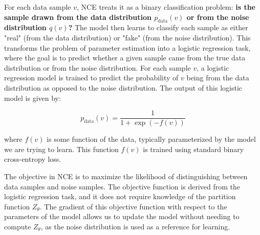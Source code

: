 \documentclass{article}
\begin{document}
\begin{enumerate}
For each data sample \( v \), NCE treats it as a binary classification problem: 
\textbf{is the sample drawn from the data distribution \( p_{\text{data}}(v) \) or from the noise distribution \( q(v) \)?}
The model then learns to classify each sample as either "real" (from the data distribution) or "fake" (from the noise distribution). This transforms the problem of parameter estimation into a logistic regression task, where the goal is to predict whether a given sample came from the true data distribution or from the noise distribution. For each sample \( v \), a logistic regression model is trained to predict the probability of \( v \) being from the data distribution as opposed to the noise distribution. The output of this logistic model is given by:

\[
p_{\text{data}}(v) = \frac{1}{1 + \exp(-f(v))}
\]

where \( f(v) \) is some function of the data, typically parameterized by the model we are trying to learn. This function \( f(v) \) is trained using standard binary cross-entropy loss.

The objective in NCE is to maximize the likelihood of distinguishing between data samples and noise samples. The objective function is derived from the logistic regression task, and it does not require knowledge of the partition function \( Z_\theta \). The gradient of this objective function with respect to the parameters of the model allows us to update the model without needing to compute \( Z_\theta \), as the noise distribution is used as a reference for learning.



\end{enumerate}
\end{document}
